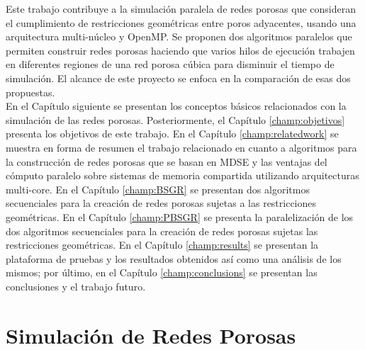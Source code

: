 Este trabajo contribuye a la simulaci\'on paralela de redes porosas que consideran el cumplimiento de restricciones geom\'etricas entre poros adyacentes, usando una arquitectura multi-núcleo y OpenMP. Se proponen dos algoritmos paralelos que permiten construir redes porosas haciendo que varios hilos de ejecuci\'on trabajen en diferentes regiones de una red porosa c\'ubica para disminuir el tiempo de simulaci\'on. El alcance de este proyecto se enfoca en la comparaci\'on de esas dos propuestas. \\


En el Cap\'itulo siguiente se presentan los conceptos b\'asicos relacionados con la simulaci\'on de las redes porosas. Posteriormente, el Cap\'itulo \ref{champ:objetivos} presenta los objetivos de este trabajo. En el Capítulo \ref{champ:relatedwork} se muestra en forma de resumen el trabajo relacionado en cuanto a algoritmos para la construcción de redes porosas que se basan en MDSE y las ventajas del c\'omputo paralelo sobre sistemas de memoria compartida utilizando arquitecturas multi-core. En el Capítulo \ref{champ:BSGR} se presentan dos algoritmos secuenciales para la creación de redes porosas sujetas a las restricciones geométricas. En el Capítulo \ref{champ:PBSGR} se presenta la paralelización de los dos algoritmos secuenciales para la creación de redes porosas sujetas las restricciones geométricas. En el Capítulo \ref{champ:results} se presentan la plataforma de pruebas y los resultados obtenidos así como una análisis de los mismos; por último, en el Capítulo \ref{champ:conclusions} se presentan las conclusiones y el trabajo futuro.


\chapter{Simulaci\'on de Redes Porosas}
\label{champ:construction}

